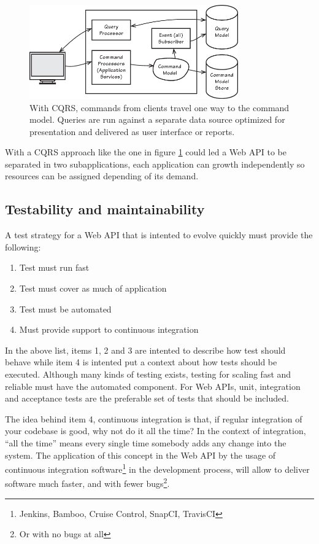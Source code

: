\documentclass[10pt,article]{IEEEtran}
\begin{document}
\begin{figure}[h]
    \centering
    \includegraphics[width=9cm]{cqrs}
    \caption{With CQRS, commands from clients travel one way to the command model. Queries are run against a separate data source optimized for presentation and delivered as user interface or reports\cite{vernon:iddd}.}
    \label{fig:cqrs}
\end{figure}

With a CQRS approach like the one in figure \ref{fig:cqrs} could led a Web API to be separated in two subapplications, each application can growth independently so resources can be assigned depending of its demand. 

\subsection{Testability and maintainability}
A test strategy for a Web API that is intented to evolve quickly must provide the following:
\begin{enumerate}
    \item
    Test must run fast
    \item
    Test must cover as much of application
    \item
    Test must be automated
    \item
    Must provide support to continuous integration
\end{enumerate}

In the above list, items 1, 2 and 3 are intented to describe how test should behave while item 4 is intented put a context about how tests should be executed. Although many kinds of testing exists\cite{humble}, testing for scaling fast and reliable must have the automated component. For Web APIs, unit, integration and acceptance tests are the preferable set of tests that should be included.

The idea behind item 4, continuous integration is that, if regular integration of your codebase is good, why not do it all the time? In the context of integration, ``all the time'' means every single time somebody adds any change into the system\cite{beck:ci}. The application of this concept in the Web API by the usage of continuous integration software\footnote{Jenkins, Bamboo, Cruise Control, SnapCI, TravisCI} in the development process, will allow to deliver software much faster, and with fewer bugs\footnote{Or with no bugs at all}. 
\end{document}
